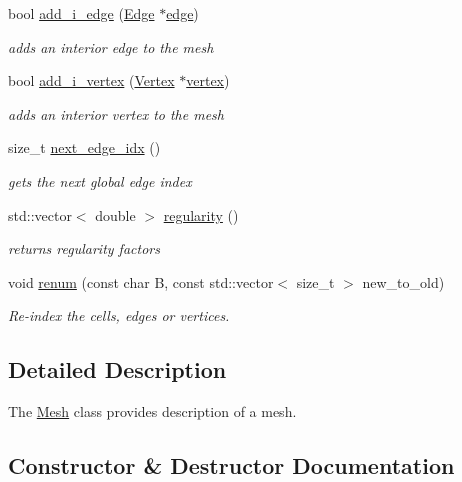 \begin{DoxyCompactItemize}
bool \hyperlink{group__Mesh_ga1e55100bee1027f4ab3980bf020c5df7}{add\+\_\+i\+\_\+edge} (\hyperlink{classHArDCore2D_1_1Edge}{Edge} $\ast$\hyperlink{classHArDCore2D_1_1Mesh_acad7cdf3d2c00fa6fc23ff77c63c7d1a}{edge})
\begin{DoxyCompactList}\small\item\em adds an interior edge to the mesh \end{DoxyCompactList}\item 
bool \hyperlink{group__Mesh_gae0eac0c28f63b2106e97e595cb95248e}{add\+\_\+i\+\_\+vertex} (\hyperlink{classHArDCore2D_1_1Vertex}{Vertex} $\ast$\hyperlink{classHArDCore2D_1_1Mesh_ad099224c697c05a57fad6a47fdcd9e76}{vertex})
\begin{DoxyCompactList}\small\item\em adds an interior vertex to the mesh \end{DoxyCompactList}\item 
size\+\_\+t \hyperlink{group__Mesh_ga950e099c278cd367de1a87c6dcaefafe}{next\+\_\+edge\+\_\+idx} ()
\begin{DoxyCompactList}\small\item\em gets the next global edge index \end{DoxyCompactList}\item 
std\+::vector$<$ double $>$ \hyperlink{classHArDCore2D_1_1Mesh_a530b237c8c966c21bdc3a16b4f266660}{regularity} ()
\begin{DoxyCompactList}\small\item\em returns regularity factors \end{DoxyCompactList}\item 
void \hyperlink{classHArDCore2D_1_1Mesh_af77873bbc892a7a5b37bf4773c55aefc}{renum} (const char B, const std\+::vector$<$ size\+\_\+t $>$ new\+\_\+to\+\_\+old)
\begin{DoxyCompactList}\small\item\em Re-\/index the cells, edges or vertices. \end{DoxyCompactList}\end{DoxyCompactItemize}


\subsection{Detailed Description}
The \hyperlink{classHArDCore2D_1_1Mesh}{Mesh} class provides description of a mesh. 

\subsection{Constructor \& Destructor Documentation}
\mbox{\label{classHArDCore2D_1_1Mesh_a2af137f1571af89172b9c102302c416b}} 
